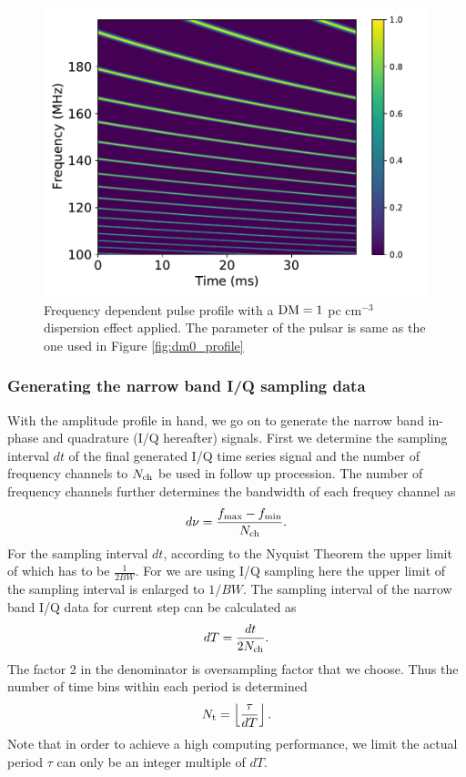 \documentclass[fleqn,usenatbib]{mnras}
\begin{document}
 

 \begin{figure}
    \centering
    \includegraphics[width=0.9\columnwidth]{dm1_profile.pdf}
    \caption{Frequency dependent pulse profile with a $\rm DM=1$ pc cm$^{-3}$ dispersion effect applied. The parameter of the pulsar
    is same as the one used in Figure \ref{fig:dm0_profile}}
    \label{fig:dm1_profile}
 \end{figure}

\subsubsection{Generating the narrow band I/Q sampling data}
 
With the amplitude profile in hand, we go on to generate the narrow band in-phase and quadrature (I/Q hereafter) signals.
First we determine the sampling interval $dt$ of the final generated I/Q time series signal and the number of frequency channels to $N_{\rm ch}$ be used in follow up procession.
The number of frequency channels further determines the bandwidth of each frequey channel as
\begin{gather}
    d\nu=\frac{f_{\max}-f_{\min}}{N_{\rm ch}}.
\end{gather}
For the sampling interval $dt$, according to the Nyquist Theorem the upper limit of which has to be $\frac{1}{2BW}$. 
For we are using I/Q sampling here the upper limit of the sampling interval is enlarged to $1/BW$.
The sampling interval of the narrow band I/Q data for current step can be calculated as
\begin{gather}
 dT=\frac{dt}{2N_{\rm ch}}.
\end{gather}
The factor 2 in the denominator is oversampling factor that we choose.
Thus the number of time bins within each period is determined 
\begin{gather}
 N_{\rm t}=\left\lfloor\frac{\tau}{dT}\right\rfloor.
\end{gather}
Note that in order to achieve a high computing performance, we limit the actual period $\tau$ can only be an integer multiple of $dT$.
\end{document}
